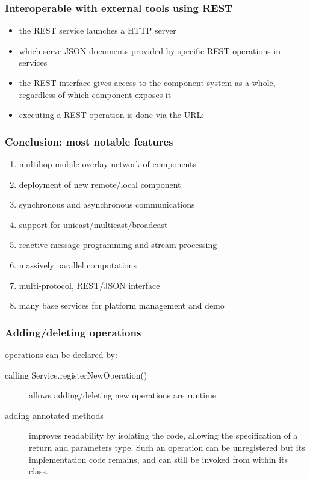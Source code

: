 \documentclass[11pt]{beamer}
\begin{document}
 

\begin{frame}
\frametitle{Interoperable with external tools using REST}
\begin{itemize}
	\item the REST service launches a HTTP server
	\item which serve JSON documents provided by specific REST operations in services
	\item the REST interface gives access to the  component system as a whole, regardless of which component exposes it
	\item executing a REST operation is done via the URL:  
\end{itemize}
\end{frame}


\begin{frame}
\frametitle{Conclusion: most notable features}
\begin{enumerate}
	\item multihop mobile overlay network of components
	\item deployment of new remote/local component  
	\item synchronous and asynchronous communications
	\item support for unicast/multicast/broadcast
	\item reactive message programming and stream processing
	\item massively parallel computations
	\item multi-protocol, REST/JSON interface
	\item many base services for platform management and demo
\end{enumerate}
\end{frame}


\begin{frame}
\frametitle{Adding/deleting operations}
operations can be declared by:
\begin{description}
	\item[calling Service.registerNewOperation()] allows adding/deleting new operations are runtime
	\item[adding annotated methods] improves readability by isolating the code, allowing the specification of a return and parameters type. Such an operation can be unregistered but its implementation code remains, and can still be invoked from within its class.
\end{description}
\end{frame}
\end{document}
